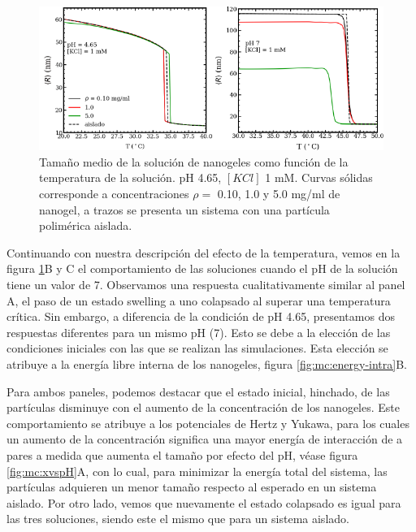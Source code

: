 	\begin{figure}[!htb]
		\centering
		\includegraphics[width=0.99\linewidth]{Figures/graph-mc/rvst.pdf}
		\caption{Tama\~no medio de la soluci\'on de nanogeles como funci\'on de la temperatura de la soluci\'on. pH 4.65, $[KCl]$ 1 mM. Curvas s\'olidas corresponde a concentraciones $\rho =$ 0.10, 1.0 y 5.0 mg/ml de nanogel, a trazos se presenta un sistema con una part\'icula polim\'erica aislada.}
		\label{fig:mc:temperatura-r}
	\end{figure}
	
Continuando con nuestra descripci\'on del efecto de la temperatura, vemos en la figura \ref{fig:mc:temperatura-r}B y C el comportamiento de las soluciones cuando el pH de la soluci\'on tiene un valor de 7. Observamos una respuesta cualitativamente similar al panel A, el paso de un estado swelling a uno colapsado al superar una temperatura cr\'itica. Sin embargo, a diferencia de la condici\'on de pH 4.65, presentamos dos respuestas diferentes para un mismo pH (7). Esto se debe a la elecci\'on de las condiciones iniciales con las que se realizan las simulaciones. Esta elecci\'on se atribuye a la energ\'ia libre interna de los nanogeles, figura \ref{fig:mc:energy-intra}B.

Para ambos paneles, podemos destacar que el estado inicial, hinchado, de las part\'iculas disminuye con el aumento de la concentraci\'on de los nanogeles. Este comportamiento se atribuye a los potenciales de Hertz y Yukawa, para los cuales un aumento de la concentraci\'on significa una mayor energ\'ia de interacci\'on de a pares a medida que aumenta el tama\~no por efecto del pH, v\'ease figura \ref{fig:mc:xvspH}A, con lo cual, para minimizar la energ\'ia total del sistema, las part\'iculas adquieren un menor tama\~no respecto al esperado en un sistema aislado. Por otro lado, vemos que nuevamente el estado colapsado es igual para las tres soluciones, siendo este el mismo que para un sistema aislado.

